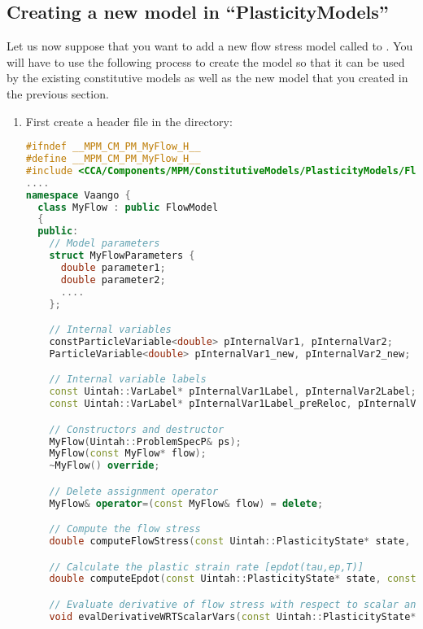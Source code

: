 \subsection{Creating a new model in ``PlasticityModels''}
Let us now suppose that you want to add a new flow stress model called 
 to \Vaango.  You will have to use the following process to
create the model so that it can be used by the existing constitutive models
as well as the new model that you created in the previous section.
\begin{enumerate}
  \item First create a header file  in the 
        directory:
\begin{lstlisting}[language=Cpp]
#ifndef __MPM_CM_PM_MyFlow_H__
#define __MPM_CM_PM_MyFlow_H__
#include <CCA/Components/MPM/ConstitutiveModels/PlasticityModels/FlowModel.h>
....
namespace Vaango {
  class MyFlow : public FlowModel
  {
  public:
    // Model parameters
    struct MyFlowParameters {
      double parameter1;
      double parameter2;
      ....
    };

    // Internal variables
    constParticleVariable<double> pInternalVar1, pInternalVar2;
    ParticleVariable<double> pInternalVar1_new, pInternalVar2_new;

    // Internal variable labels
    const Uintah::VarLabel* pInternalVar1Label, pInternalVar2Label;
    const Uintah::VarLabel* pInternalVar1Label_preReloc, pInternalVar2Label_preReloc;

    // Constructors and destructor
    MyFlow(Uintah::ProblemSpecP& ps);
    MyFlow(const MyFlow* flow);
    ~MyFlow() override;

    // Delete assignment operator
    MyFlow& operator=(const MyFlow& flow) = delete;

    // Compute the flow stress 
    double computeFlowStress(const Uintah::PlasticityState* state, const double& delT, const double& tolerance, const Uintah::MPMMaterial* matl, const Uintah::particleIndex idx) override;

    // Calculate the plastic strain rate [epdot(tau,ep,T)]
    double computeEpdot(const Uintah::PlasticityState* state, const double& delT, const double& tolerance, const Uintah::MPMMaterial* matl, const Uintah::particleIndex idx) override;

    // Evaluate derivative of flow stress with respect to scalar and internal variables.
    void evalDerivativeWRTScalarVars(const Uintah::PlasticityState* state, const Uintah::particleIndex idx, Uintah::Vector& derivs) override;


\end{lstlisting}
\end{enumerate}
